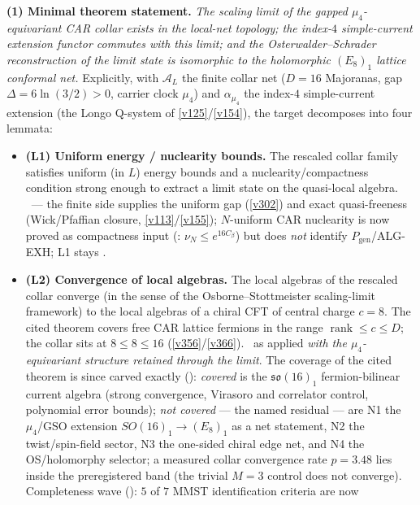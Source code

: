 \documentclass[11pt,a4paper]{article}
\begin{document}
\par\smallskip\noindent\textbf{(1) Minimal theorem statement.} \emph{The scaling limit of the
gapped $\mu_4$-equivariant CAR collar exists in the local-net topology; the index-$4$
simple-current extension functor commutes with this limit; and the Osterwalder--Schrader
reconstruction of the limit state is isomorphic to the holomorphic $(E_8)_1$ lattice conformal
net.} Explicitly, with $\mathcal A_L$ the finite collar net ($D=16$ Majoranas, gap
$\Delta=6\ln(3/2)>0$, carrier clock $\mu_4$) and $\alpha_{\mu_4}$ the index-$4$ simple-current
extension (the Longo Q-system of \vref{v125}/\vref{v154}), the target decomposes into four
lemmata:
\begin{itemize}
\item \textbf{(L1) Uniform energy / nuclearity bounds.} The rescaled collar family satisfies
  uniform (in $L$) energy bounds and a nuclearity/compactness condition strong enough to extract
  a limit state on the quasi-local algebra. \mO\ --- the finite side supplies the uniform gap
  (\vref{v302}) and exact quasi-freeness (Wick/Pfaffian closure, \vref{v113}/\vref{v155});
  $N$-uniform CAR nuclearity is now proved as compactness input
  (:
  $\nu_N\le e^{16 C_\beta}$) but does \emph{not} identify $P_{\mathrm{gen}}$/ALG-EXH;
  L1 stays \mO.
\item \textbf{(L2) Convergence of local algebras.} The local algebras of the rescaled collar
  converge (in the sense of the Osborne--Stottmeister scaling-limit framework) to the local
  algebras of a chiral CFT of central charge $c=8$. The cited theorem covers free CAR lattice
  fermions in the range $\operatorname{rank}\le c\le D$; the collar sits at $8\le8\le16$
  (\vref{v356}/\vref{v366}). \mO\ as applied \emph{with the $\mu_4$-equivariant structure
  retained through the limit}. The coverage of the cited theorem is since carved exactly
  (): \emph{covered} is the $\mathfrak{so}(16)_1$
  fermion-bilinear current algebra (strong convergence, Virasoro and correlator control,
  polynomial error bounds); \emph{not covered} --- the named residual --- are N1 the
  $\mu_4$/GSO extension $SO(16)_1\to(E_8)_1$ as a net statement, N2 the twist/spin-field
  sector, N3 the one-sided chiral edge net, and N4 the OS/holomorphy selector; a measured
  collar convergence rate $p=3.48$ lies inside the preregistered band (the trivial $M{=}3$
  control does not converge).  Completeness wave
  (): $5$ of $7$ MMST identification criteria are now

\end{itemize}
\end{document}
